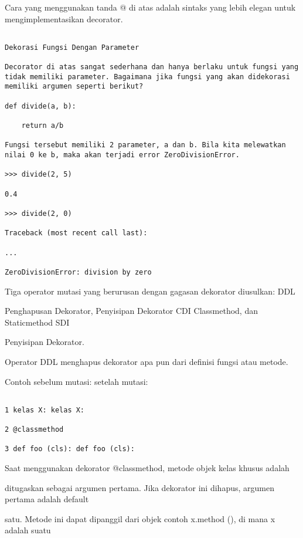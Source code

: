 \documentclass[12pt,a4paper]{article}
\begin{document}
Cara yang menggunakan tanda @ di atas adalah sintaks yang lebih elegan untuk mengimplementasikan decorator.



\begin{verbatim}

Dekorasi Fungsi Dengan Parameter

Decorator di atas sangat sederhana dan hanya berlaku untuk fungsi yang tidak memiliki parameter. Bagaimana jika fungsi yang akan didekorasi memiliki argumen seperti berikut?

def divide(a, b):

    return a/b

Fungsi tersebut memiliki 2 parameter, a dan b. Bila kita melewatkan nilai 0 ke b, maka akan terjadi error ZeroDivisionError.

>>> divide(2, 5)

0.4

>>> divide(2, 0)

Traceback (most recent call last):

...

ZeroDivisionError: division by zero

\end{verbatim}



Tiga operator mutasi yang berurusan dengan gagasan dekorator diusulkan: DDL

Penghapusan Dekorator, Penyisipan Dekorator CDI Classmethod, dan Staticmethod SDI

Penyisipan Dekorator.

Operator DDL menghapus dekorator apa pun dari definisi fungsi atau metode.

Contoh sebelum mutasi: setelah mutasi:

\begin{verbatim}

1 kelas X: kelas X:

2 @classmethod

3 def foo (cls): def foo (cls):

\end{verbatim}

Saat menggunakan dekorator @classmethod, metode objek kelas khusus adalah

ditugaskan sebagai argumen pertama. Jika dekorator ini dihapus, argumen pertama adalah default

satu. Metode ini dapat dipanggil dari objek contoh x.method (), di mana x adalah suatu
\end{document}
